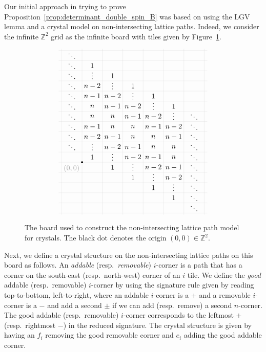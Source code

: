 \documentclass[11pt, leqno]{amsart}
\theoremstyle{plain}
\theoremstyle{definition}
\numberwithin{equation}{section}
\newcommand{\Z}{\mathbb{Z}}
\newcommand{\defn}[1]{{\color{darkred}\emph{#1}}} %
\begin{document}
Our initial approach in trying to prove Proposition~\ref{prop:determinant_double_spin_B} was based on using the LGV lemma and a crystal model on non-intersecting lattice paths. Indeed, we consider the infinite $\Z^2$ grid as the infinite board with tiles given by Figure~\ref{fig:lattice_board}.

\begin{figure}
\[
\begin{tikzpicture}[yscale=0.5]
\clip (-0.65,-14.65) rectangle (6.65, 1.65);
\foreach \y in {1,...,10} {
  \draw (0, \y-9+0.15) node {$\ddots$};
}
\foreach \y in {1,...,10} {
  \draw (6, \y-15+0.15) node {$\ddots$};
}
\draw[step=1,xshift=0.5cm,yshift=0.5cm,very thin,gray!40] (-2,2) grid (7,-16);
\foreach \x in {1,...,5} {
  \draw (\x,1-\x) node {$1$};
  \draw (\x,-8-\x) node {$1$};
  \draw (\x,0-\x+0.2) node {$\vdots$};
  \draw (\x,-7-\x+0.2) node {$\vdots$};
  \draw (\x,-1-\x) node {$n-2$};
  \draw (\x,-2-\x) node {$n-1$};
  \draw (\x,-3-\x) node {$n$};
  \draw (\x,-4-\x) node {$n$};
  \draw (\x,-5-\x) node {$n-1$};
  \draw (\x,-6-\x) node {$n-2$};
}
\node[circle,inner sep=1,fill=black] at (0.5,-9.5) {};
\node[gray!70,anchor=north east] at (0.5,-9.5) {$(0,0)$};
\end{tikzpicture}
\]
\caption{The board used to construct the non-intersecting lattice path model for crystals. The black dot denotes the origin $(0,0) \in \Z^2$.}
\label{fig:lattice_board}
\end{figure}

Next, we define a crystal structure on the non-intersecting lattice paths on this board as follows. An \defn{addable} (resp.\ \defn{removable}) $i$-corner is a path that has a corner on the south-east (resp.\ north-west) corner of an $i$ tile.
We define the \defn{good} addable (resp.\ removable) $i$-corner by using the signature rule given by reading top-to-bottom, left-to-right, where an addable $i$-corner is a $+$ and a removable $i$-corner is a $-$ and add a second $\pm$ if we can add (resp.\ remove) a second $n$-corner. The good addable (resp.\ removable) $i$-corner corresponds to the leftmost $+$ (resp.\ rightmost $-$) in the reduced signature.
The crystal structure is given by having an $f_i$ removing the good removable corner and $e_i$ adding the good addable corner.
\end{document}
